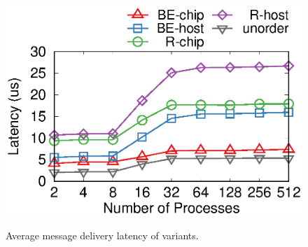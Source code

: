 \begin{figure}[t]
\begin{minipage}[]{.32\textwidth}
{			\includegraphics[width=\textwidth]{gnuplot/reorder_testbed.eps}
		}
		\newline
		\caption{Average message delivery latency of \sys{} variants.}
	\end{minipage}
	\hspace{0.01\textwidth}
	\begin{minipage}[]{.32\textwidth}
		\centering

\end{minipage}
\end{figure}
